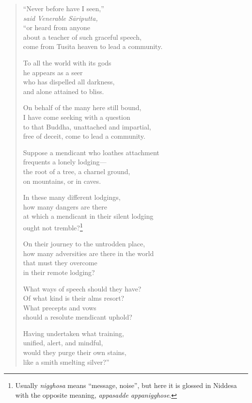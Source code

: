 \documentclass[12pt,openany]{book}%
\newcommand*{\scspeaker}[1]{\hspace{2em}\textit{#1}}
\begin{document}
\begin{verse}%
“Never before have I seen,” \\
\scspeaker{said Venerable \textsanskrit{Sāriputta}, }\\
“or heard from anyone \\
about a teacher of such graceful speech, \\
come from Tusita heaven to lead a community. 

To all the world with its gods \\
he appears as a seer \\
who has dispelled all darkness, \\
and alone attained to bliss. 

On behalf of the many here still bound, \\
I have come seeking with a question \\
to that Buddha, unattached and impartial, \\
free of deceit, come to lead a community. 

Suppose a mendicant who loathes attachment \\
frequents a lonely lodging—\\
the root of a tree, a charnel ground, \\
on mountains, or in caves. 

In these many different lodgings, \\
how many dangers are there \\
at which a mendicant in their silent lodging \\
ought not tremble?\footnote{Usually \textit{nigghosa} means “message, noise”, but here it is glossed in Niddesa with the opposite meaning, \textit{appasadde appanigghose}. } 

On their journey to the untrodden place, \\
how many adversities are there in the world \\
that must they overcome \\
in their remote lodging? 

What ways of speech should they have? \\
Of what kind is their alms resort? \\
What precepts and vows \\
should a resolute mendicant uphold? 

Having undertaken what training, \\
unified, alert, and mindful, \\
would they purge their own stains, \\
like a smith smelting silver?” 


\end{verse}
\end{document}
